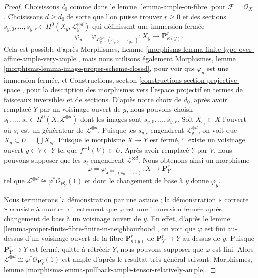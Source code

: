 \begin{proof}
Choisissons $d_0$ comme dans le lemme \ref{lemma-ample-on-fibre} pour
$\mathcal{F} = \mathcal{O}_X$. Choisissons $d \geq d_0$
de sorte que l'on puisse trouver $r \geq 0$ et des sections
$s_{y, 0}, \ldots, s_{y, r} \in H^0(X_y, \mathcal{L}_y^{\otimes d})$
qui définissent une immersion fermée
$$
\varphi_y =
\varphi_{\mathcal{L}_y^{\otimes d}, (s_{y, 0}, \ldots, s_{y, r})} :
X_y \to \mathbf{P}^r_{\kappa(y)}.
$$
Cela est possible d'après Morphismes, Lemme
\ref{morphisms-lemma-finite-type-over-affine-ample-very-ample},
mais nous utilisons également
Morphismes, lemme \ref{morphisms-lemma-image-proper-scheme-closed},
pour voir que $\varphi_y$ est une immersion fermée, et
Constructions, section \ref{constructions-section-projective-space},
pour la description des morphismes vers l'espace
projectif en termes de faisceaux inversibles et de sections.
D'après notre choix de $d_0$, après avoir remplacé $Y$ par un voisinage ouvert
de $y$, nous pouvons choisir
$s_0, \ldots, s_r \in H^0(X, \mathcal{L}^{\otimes d})$
dont les images sont $s_{y, 0}, \ldots, s_{y, r}$.
Soit $X_{s_i} \subset X$ l'ouvert où $s_i$
est un générateur de $\mathcal{L}^{\otimes d}$. Puisque
les $s_{y, i}$ engendrent $\mathcal{L}_y^{\otimes d}$, on voit que
$X_y \subset U = \bigcup X_{s_i}$. Puisque
le morphisme $X \to Y$ est fermé, il existe
un voisinage ouvert $y \in V \subset Y$
tel que $f^{-1}(V) \subset U$.
Après avoir remplacé $Y$ par $V$, nous pouvons supposer que
les $s_i$ engendrent $\mathcal{L}^{\otimes d}$. Nous obtenons
ainsi un morphisme
$$
\varphi = \varphi_{\mathcal{L}^{\otimes d}, (s_0, \ldots, s_r)} :
X \longrightarrow \mathbf{P}^r_Y
$$
tel que $\mathcal{L}^{\otimes d} \cong \varphi^*\mathcal{O}_{\mathbf{P}^r_Y}(1)$
et dont le changement de base à $y$ donne $\varphi_y$.

\medskip\noindent
Nous terminerons la démonstration par une astuce ; la démonstration « correcte »
consiste à montrer directement que $\varphi$ est une immersion
fermée après changement de base à un voisinage ouvert de $y$. En
effet, d'après le lemme \ref{lemma-proper-finite-fibre-finite-in-neighbourhood},
on voit que $\varphi$ est fini au-dessus d'un voisinage ouvert
de la fibre $\mathbf{P}^r_{\kappa(y)}$ de $\mathbf{P}^r_Y \to Y$
au-dessus de $y$. Puisque $\mathbf{P}^r_Y \to Y$ est fermé, quitte à
rétrécir $Y$, nous pouvons supposer que $\varphi$ est fini.
Alors $\mathcal{L}^{\otimes d} \cong \varphi^*\mathcal{O}_{\mathbf{P}^r_Y}(1)$
est ample d'après le résultat très général suivant:
Morphismes, lemme \ref{morphisms-lemma-pullback-ample-tensor-relatively-ample}.
\end{proof}





